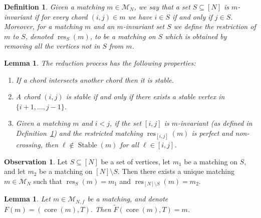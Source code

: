 \documentclass[11pt]{article}
\newtheorem{definition}[theo]{Definition}
\newtheorem{lemma}[theo]{Lemma}
\theoremstyle{definition}
\numberwithin{equation}{section}
\newcommand{\Stable}{\operatorname{Stable}}
\newcommand{\core}{\operatorname{core}}
\newcommand{\res}{\operatorname{res}}
\newcommand{\M}{\mathcal{M}}
\newtheorem{observation}[theo]{Observation}
\begin{document}
\begin{definition}
\label{def:restriction of matching}
    Given a matching $m \in \M_N$, we say that a set $S \subseteq [N]$ is $m$-invariant if for every chord $(i,j) \in m$ we have $i \in S$ if and only if $j \in S$. Moreover, for a matching $m$ and an $m$-invariant set $S$ we define the \emph{restriction} of $m$ to $S$, denoted $\res_S(m)$, to be a matching on $S$ which is obtained by removing all the vertices not in $S$ from $m$.
\end{definition}

\begin{lemma}
\label{lem:properties of core}
    The reduction process has the following properties:
    \begin{enumerate}[label=(\arabic*), ref=\ref{lem:properties of core}\text{ (part~}\arabic*)]
        \item \label{lem:properties of core--intersect stable} If a chord intersects another chord then it is stable.
        \item \label{lem:properties of core--chord unstable iff all midpoints unstable} A chord $(i,j)$ is stable if and only if there exists a stable vertex in $\{i+1,\dots,j-1\}$.
        \item \label{lem:properties of core--perfect non-crossing unstable} Given a matching $m$ and $i < j$, if the set $[i,j]$ is $m$-invariant \textup{(}as defined in Definition~\ref{def:restriction of matching}\textup{)} and the restricted matching $\res_{[i,j]}(m)$ is perfect and non-crossing, then $\ell \notin \Stable(m)$ for all $\ell \in [i,j]$.
    \end{enumerate}
\end{lemma}

\begin{observation}
\label{obs:restriction of matching to set and complement defines uniquely}
    Let $S \subseteq [N]$ be a set of vertices, let $m_1$ be a matching on $S$, and let $m_2$ be a matching on $[N]\setminus S$. Then there exists a unique matching $m \in \M_N$ such that $\res_S(m) = m_1$ and $\res_{[N] \setminus S}(m) = m_2$.
\end{observation}

\begin{lemma}
\label{lem:F_tilde(F)=id}
    Let $m \in \M_{N,f}$ be a matching, and denote $F(m) = (\core(m),T)$. Then $\tilde{F}(\core(m),T) = m$.
\end{lemma}
\end{document}

